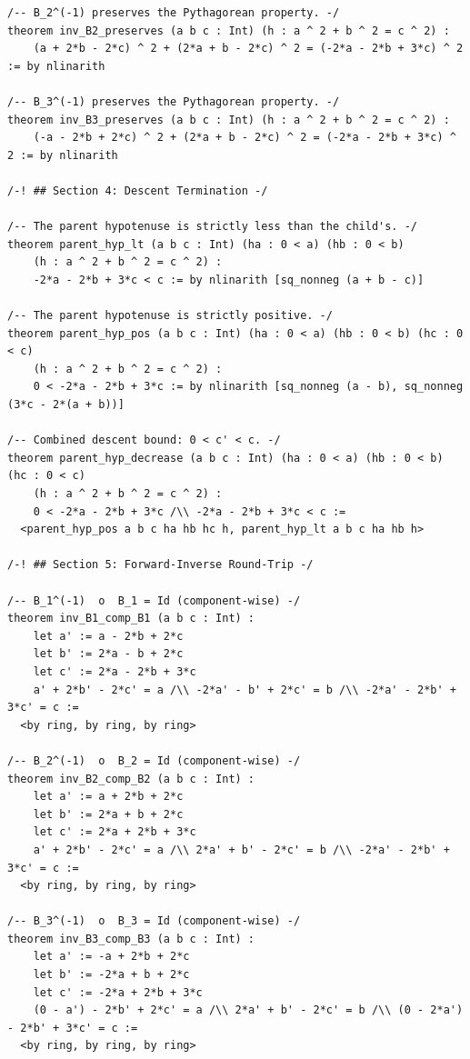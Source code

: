 \documentclass[11pt,openright,twoside]{book}
\theoremstyle{definition}
\begin{document}
\begin{lstlisting}[style=lean]
/-- B_2^(-1) preserves the Pythagorean property. -/
theorem inv_B2_preserves (a b c : Int) (h : a ^ 2 + b ^ 2 = c ^ 2) :
    (a + 2*b - 2*c) ^ 2 + (2*a + b - 2*c) ^ 2 = (-2*a - 2*b + 3*c) ^ 2 := by nlinarith

/-- B_3^(-1) preserves the Pythagorean property. -/
theorem inv_B3_preserves (a b c : Int) (h : a ^ 2 + b ^ 2 = c ^ 2) :
    (-a - 2*b + 2*c) ^ 2 + (2*a + b - 2*c) ^ 2 = (-2*a - 2*b + 3*c) ^ 2 := by nlinarith

/-! ## Section 4: Descent Termination -/

/-- The parent hypotenuse is strictly less than the child's. -/
theorem parent_hyp_lt (a b c : Int) (ha : 0 < a) (hb : 0 < b)
    (h : a ^ 2 + b ^ 2 = c ^ 2) :
    -2*a - 2*b + 3*c < c := by nlinarith [sq_nonneg (a + b - c)]

/-- The parent hypotenuse is strictly positive. -/
theorem parent_hyp_pos (a b c : Int) (ha : 0 < a) (hb : 0 < b) (hc : 0 < c)
    (h : a ^ 2 + b ^ 2 = c ^ 2) :
    0 < -2*a - 2*b + 3*c := by nlinarith [sq_nonneg (a - b), sq_nonneg (3*c - 2*(a + b))]

/-- Combined descent bound: 0 < c' < c. -/
theorem parent_hyp_decrease (a b c : Int) (ha : 0 < a) (hb : 0 < b) (hc : 0 < c)
    (h : a ^ 2 + b ^ 2 = c ^ 2) :
    0 < -2*a - 2*b + 3*c /\\ -2*a - 2*b + 3*c < c :=
  <parent_hyp_pos a b c ha hb hc h, parent_hyp_lt a b c ha hb h>

/-! ## Section 5: Forward-Inverse Round-Trip -/

/-- B_1^(-1)  o  B_1 = Id (component-wise) -/
theorem inv_B1_comp_B1 (a b c : Int) :
    let a' := a - 2*b + 2*c
    let b' := 2*a - b + 2*c
    let c' := 2*a - 2*b + 3*c
    a' + 2*b' - 2*c' = a /\\ -2*a' - b' + 2*c' = b /\\ -2*a' - 2*b' + 3*c' = c :=
  <by ring, by ring, by ring>

/-- B_2^(-1)  o  B_2 = Id (component-wise) -/
theorem inv_B2_comp_B2 (a b c : Int) :
    let a' := a + 2*b + 2*c
    let b' := 2*a + b + 2*c
    let c' := 2*a + 2*b + 3*c
    a' + 2*b' - 2*c' = a /\\ 2*a' + b' - 2*c' = b /\\ -2*a' - 2*b' + 3*c' = c :=
  <by ring, by ring, by ring>

/-- B_3^(-1)  o  B_3 = Id (component-wise) -/
theorem inv_B3_comp_B3 (a b c : Int) :
    let a' := -a + 2*b + 2*c
    let b' := -2*a + b + 2*c
    let c' := -2*a + 2*b + 3*c
    (0 - a') - 2*b' + 2*c' = a /\\ 2*a' + b' - 2*c' = b /\\ (0 - 2*a') - 2*b' + 3*c' = c :=
  <by ring, by ring, by ring>


\end{lstlisting}
\end{document}
